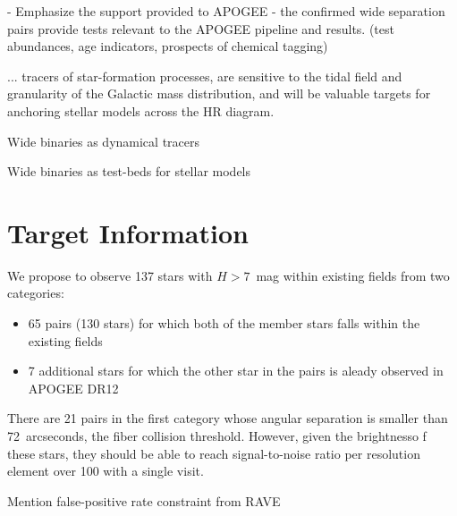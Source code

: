 \documentclass[11pt]{article}
\begin{document}
- Emphasize the support provided to APOGEE - the confirmed wide separation pairs
  provide tests relevant to the APOGEE pipeline and results. (test abundances,
  age indicators, prospects of chemical tagging)

... tracers of star-formation processes, are
sensitive to the tidal field and granularity of the Galactic mass distribution,
and will be valuable targets for anchoring stellar models across the HR diagram.

Wide binaries as dynamical tracers

Wide binaries as test-beds for stellar models

\section{Target Information}

We propose to observe 137 stars with $H>7$~mag within existing fields
from two categories:
\begin{itemize}
  \item 65 pairs (130 stars) for which both of the member stars falls
  within the existing fields
  \item 7 additional stars for which the other star in the pairs is aleady
  observed in APOGEE DR12
\end{itemize}
%
There are 21 pairs in the first category whose angular separation is smaller
than 72~arcseconds, the fiber collision threshold. However, given the
brightnesso f these stars, they should be able to reach signal-to-noise ratio
per resolution element over 100 with a single visit.

Mention false-positive rate constraint from RAVE



\end{document}

